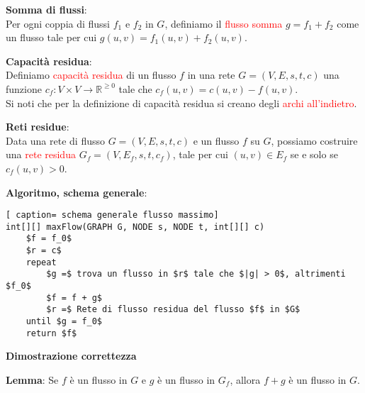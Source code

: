 \documentclass[../cheatSheetAlgoritmi.tex]{subfiles}
\begin{document}
\bigskip
\textbf{Somma di flussi}:\\
Per ogni coppia di flussi $f_1$ e $f_2$ in $G$, definiamo il \textcolor{red}{flusso somma} $g = f_1 + f_2$ come un flusso tale per cui $g(u, v) = f_1(u, v) + f_2(u, v)$.

\bigskip
\textbf{Capacità residua}:\\
Definiamo \textcolor{red}{capacità residua} di un flusso $f$ in una rete $G = (V, E, s, t, c)$ una funzione $c_f : V \times V \rightarrow \mathbb{R}^{\geq 0}$ tale che $c_f(u, v) = c(u, v) - f(u, v)$. \\
Si noti che per la definizione di capacità residua si creano degli \textcolor{red}{archi all'indietro}.

\bigskip
\textbf{Reti residue}:\\
Data una rete di flusso $G = (V, E, s, t, c)$ e un flusso $f$ su $G$, possiamo costruire una \textcolor{red}{rete residua} $G_f = (V, E_f, s, t, c_f)$, tale per cui $(u, v) \in E_f$ se e solo se $c_f(u, v) > 0$.

\bigskip
\textbf{Algoritmo, schema generale}:
 \begin{lstlisting}[ caption= schema generale flusso massimo]
int[][] maxFlow(GRAPH G, NODE s, NODE t, int[][] c)
	$f = f_0$
	$r = c$
	repeat 
		$g =$ trova un flusso in $r$ tale che $|g| > 0$, altrimenti $f_0$
		$f = f + g$
		$r =$ Rete di flusso residua del flusso $f$ in $G$
	until $g = f_0$ 
	return $f$
\end{lstlisting}
\textbf{Dimostrazione correttezza}

\bigskip
\textbf{Lemma}: Se $f$ è un flusso in $G$ e $g$ è un flusso in $G_f$, allora $f+g$ è un flusso in $G$.
\end{document}
